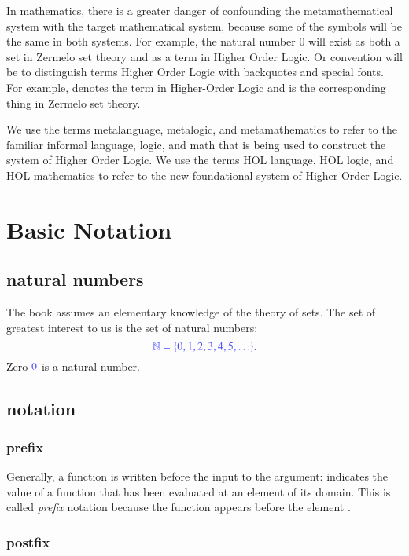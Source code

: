 \documentclass[cup9a]{cupbook}
\begin{document}
In mathematics, there is a greater danger of confounding the metamathematical system with the target mathematical system, because some of the symbols will be the same in both systems.  For example, the natural number $0$ will exist as both a set in Zermelo set theory and as a term in Higher Order Logic.   Or convention will be to distinguish terms Higher Order Logic with backquotes and special fonts.  For example, {\tt {}} denotes the term in Higher-Order Logic and  is the corresponding thing in Zermelo set theory.

We use the terms metalanguage, metalogic, and metamathematics to refer to the familiar informal language, logic, and math that is being used to construct the system of Higher Order Logic.  We use the terms HOL language, HOL logic, and HOL mathematics to refer to the new foundational system of Higher Order Logic. 


\chapter{Basic Notation}

\section{natural numbers}

The book assumes an elementary knowledge of the theory of sets.  The set of greatest interest to us is the set of natural numbers:
$$
\mc{\ring{N}=\{0,1,2,3,4,5,\ldots\}}.
$$
Zero $\mc{0}$ is a natural number.

\section{notation}

\subsection{prefix}

Generally, a function is written before the input to the argument:
 indicates the value of a function  that has been evaluated
at an element  of its domain.  This is called {\it prefix} notation
because the function  appears before the element .  

\subsection{postfix}
\end{document}
